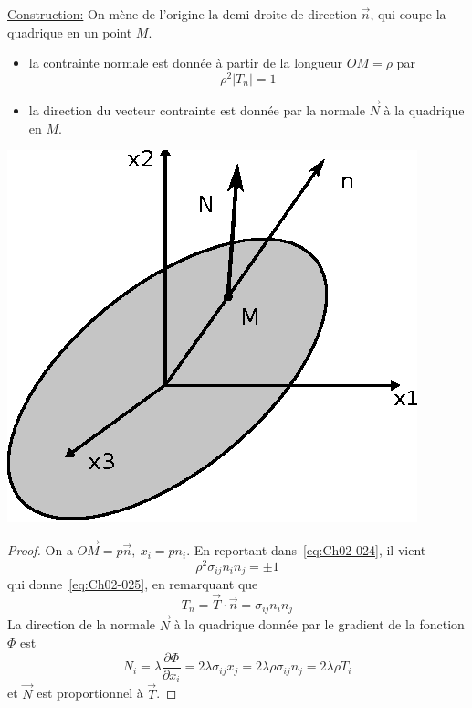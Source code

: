 \noindent\underline{Construction:} On mène de l'origine la demi-droite de direction $\vec{n}$, qui coupe la quadrique en un point $M$.  
\begin{itemize}
    \item la contrainte normale  est donnée  à  partir de  la longueur $OM=\rho$ par
        \begin{equation}
            \rho^2 |T_n| = 1
            \label{eq:Ch02-025}
        \end{equation}
    \item la direction du vecteur contrainte est donnée par la normale $\vec{N}$ à la quadrique en $M$. 
\end{itemize}
\begin{multicols}{2}
    \begin{center}
        \includegraphics{../images/T1_Ch02-0011}
    \end{center}
    \columnbreak
    \begin{proof}
        On a $\vec{OM} = p \vec{n},\ x_i = p n_i$.
    En reportant dans~\eqref{eq:Ch02-024}, il vient
    \begin{displaymath}
        \rho^2 \sigma_{ij} n_i n_j = \pm 1
    \end{displaymath}
    qui donne~\eqref{eq:Ch02-025}, en remarquant que
    \begin{displaymath}
        T_n = \vec{T} \cdot \vec{n} = \sigma_{ij} n_i n_j
    \end{displaymath}
    La direction de la normale $\vec{N}$ à la quadrique donnée par le gradient de la fonction $\Phi$  est  
    \begin{displaymath}
        N_i = \lambda \frac{\partial \Phi}{\partial x_i} = 2\lambda \sigma_{ij} x_j = 2 \lambda \rho \sigma_{ij} n_j = 2 \lambda \rho T_i
    \end{displaymath}
    et $\vec{N}$ est proportionnel à $\vec{T}$.
    \end{proof}
\end{multicols}
